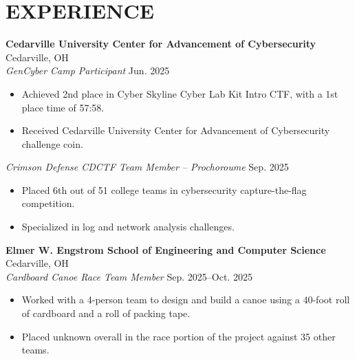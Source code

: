 \documentclass[a4paper,10pt]{article}
\newlength{\mpwidth}
\begin{document}

\section{EXPERIENCE}

\textbf{Cedarville University Center for Advancement of Cybersecurity} \hfill Cedarville, OH\\
\textit{GenCyber Camp Participant} \hfill Jun. 2025
\begin{minipage}{\mpwidth}
\begin{itemize}[nosep,after=\strut, leftmargin=1em, itemsep=3pt,label=--]
\item Achieved 2nd place in Cyber Skyline Cyber Lab Kit Intro CTF, with a 1st place time of 57:58.
\item Received Cedarville University Center for Advancement of Cybersecurity challenge coin.
\end{itemize}
\end{minipage}

\textit{Crimson Defense CDCTF Team Member -- Prochoroume} \hfill Sep. 2025
\begin{minipage}{\mpwidth}
\begin{itemize}[nosep,after=\strut, leftmargin=1em, itemsep=3pt,label=--]
\item Placed 6th out of 51 college teams in cybersecurity capture-the-flag competition.
\item Specialized in log and network analysis challenges.
\end{itemize}
\end{minipage}

\textbf{Elmer W. Engstrom School of Engineering and Computer Science} \hfill Cedarville, OH\\
\textit{Cardboard Canoe Race Team Member} \hfill Sep. 2025--Oct. 2025
\begin{minipage}{\mpwidth}
\begin{itemize}[nosep,after=\strut, leftmargin=1em, itemsep=3pt,label=--]
\item Worked with a 4-person team to design and build a canoe using a 40-foot roll of cardboard and a roll of packing tape.
\item Placed unknown overall in the race portion of the project against 35 other teams.
\end{itemize}
\end{minipage}
\end{document}
